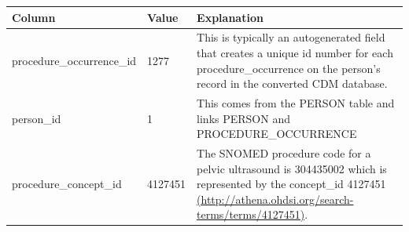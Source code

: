 \documentclass[]{book}
\begin{document}
\begin{longtable}[]{@{}lll@{}}
\toprule
\begin{minipage}[b]{0.30\columnwidth}\raggedright\strut
Column\strut
\end{minipage} & \begin{minipage}[b]{0.14\columnwidth}\raggedright\strut
Value\strut
\end{minipage} & \begin{minipage}[b]{0.47\columnwidth}\raggedright\strut
Explanation\strut
\end{minipage}\tabularnewline
\midrule
\endhead
\begin{minipage}[t]{0.30\columnwidth}\raggedright\strut
procedure\_occurrence\_id\strut
\end{minipage} & \begin{minipage}[t]{0.14\columnwidth}\raggedright\strut
1277\strut
\end{minipage} & \begin{minipage}[t]{0.47\columnwidth}\raggedright\strut
This is typically an autogenerated field that creates a unique id number
for each procedure\_occurrence on the person's record in the converted
CDM database.\strut
\end{minipage}\tabularnewline
\begin{minipage}[t]{0.30\columnwidth}\raggedright\strut
person\_id\strut
\end{minipage} & \begin{minipage}[t]{0.14\columnwidth}\raggedright\strut
1\strut
\end{minipage} & \begin{minipage}[t]{0.47\columnwidth}\raggedright\strut
This comes from the PERSON table and links PERSON and
PROCEDURE\_OCCURRENCE\strut
\end{minipage}\tabularnewline
\begin{minipage}[t]{0.30\columnwidth}\raggedright\strut
procedure\_concept\_id\strut
\end{minipage} & \begin{minipage}[t]{0.14\columnwidth}\raggedright\strut
4127451\strut
\end{minipage} & \begin{minipage}[t]{0.47\columnwidth}\raggedright\strut
The SNOMED procedure code for a pelvic ultrasound is 304435002 which is
represented by the concept\_id 4127451
\href{http://athena.ohdsi.org/search-terms/terms/4127451}{(http://athena.ohdsi.org/search-terms/terms/4127451)}.\strut
\end{minipage}\tabularnewline

\end{longtable}
\end{document}
